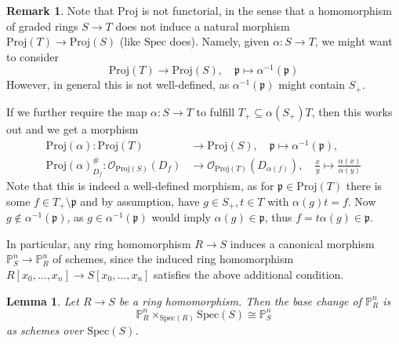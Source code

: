 \documentclass{scrartcl}
\renewcommand{\P}{\mathbb{P}}
\newcommand{\p}{\mathfrak{p}}
\newcommand{\Spec}{\mathrm{Spec}}
\newcommand{\Proj}{\mathrm{Proj}}
\renewcommand{\O}{\mathcal{O}}
\newtheorem{lemma}[prop]{Lemma}
\theoremstyle{definition}
\newtheorem{remark}[prop]{Remark}
\begin{document}
\begin{remark}
    \label{prop:functoriality_proj}
    Note that $\Proj$ is not functorial, in the sense that a homomorphism of graded rings $S \to T$ does not induce a natural morphism $\Proj(T) \to \Proj(S)$ (like $\Spec$ does).
    Namely, given $\alpha: S \to T$, we might want to consider
    \begin{equation*}
        \Proj(T) \to \Proj(S), \quad \p \mapsto \alpha^{-1}(\p)
    \end{equation*}
    However, in general this is not well-defined, as $\alpha^{-1}(\p)$ might contain $S_+$.

    If we further require the map $\alpha: S \to T$ to fulfill $T_+ \subseteq \alpha(S_+)T$, then this works out and we get a morphism
    \begin{align*}
        \Proj(\alpha): \Proj(T) &\to \Proj(S), \quad \p \mapsto \alpha^{-1}(\p), \\
        \Proj(\alpha)^\#_{D_f}: \O_{\Proj(S)}(D_f) &\to \O_{\Proj(T)}(D_{\alpha(f)}), \quad \frac x y \mapsto \frac {\alpha(x)} {\alpha(y)}
    \end{align*}
    Note that this is indeed a well-defined morphism, as for $\p \in \Proj(T)$ there is some $f \in T_+ \setminus \p$ and by assumption, have $g \in S_+, t \in T$ with $\alpha(g)t = f$.
    Now $g \notin \alpha^{-1}(\p)$, as $g \in \alpha^{-1}(\p)$ would imply $\alpha(g) \in \p$, thus $f = t\alpha(g) \in \p$.

    In particular, any ring homomorphism $R \to S$ induces a canonical morphism $\P_S^n \to \P_R^n$ of schemes, since the induced ring homomorphism $R[x_0, ..., x_n] \to S[x_0, ..., x_n]$ satisfies the above additional condition.
\end{remark}
\begin{lemma}
    \label{prop:projective_space_base_change}
    Let $R \to S$ be a ring homomorphism.
    Then the base change of $\P_R^n$ is
    \begin{equation*}
        \P_R^n \times_{\Spec(R)} \Spec(S) \cong \P_S^n
    \end{equation*}
    as schemes over $\Spec(S)$.
\end{lemma}
\end{document}
